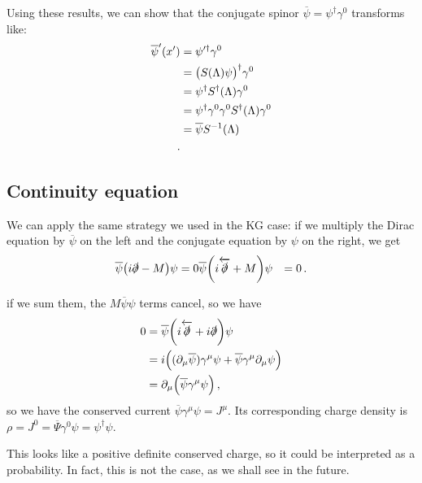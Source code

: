 \documentclass[main.tex]{subfiles}
\begin{document}
Using these results, we can show that the conjugate spinor \(\overline{\psi} = \psi ^\dag \gamma^{0}\) transforms like: 
%
\begin{subequations}
\begin{align}
\overline{\psi}' (x') &= \psi^{\prime \dag} \gamma^{0}  \\
&= \qty(S(\Lambda ) \psi ) ^\dag \gamma^{0}  \\
&= \psi ^\dag S ^\dag (\Lambda ) \gamma^{0} \\
&= \psi ^\dag \gamma^{0} \gamma^{0} S ^\dag (\Lambda ) \gamma^{0} \\
&= \overline{\psi} S^{-1}(\Lambda ) \\
\,.
\end{align}
\end{subequations}

\subsection{Continuity equation}

We can apply the same strategy we used in the KG case: if we multiply the Dirac equation by \(\overline{\psi}\) on the left and the conjugate equation by \(\psi \) on the right, we get 
%
\begin{align}
\overline{\psi} \qty(i \slashed{\partial} - M ) \psi &= 0 
\overline{\psi} \qty(i \overleftarrow{\slashed{\partial}} + M ) \psi &= 0 
\,.
\end{align}

if we sum them, the \(M \overline{\psi} \psi  \) terms cancel, so we have 
%
\begin{subequations}
\begin{align}
0 &= \overline{\psi} \qty(i \overleftarrow{\slashed{\partial}} + i \slashed{\partial}) \psi   \\
&= i \qty( (\partial_{\mu }\overline{\psi}) \gamma^{\mu } \psi   + \overline{\psi} \gamma^{\mu }\partial_{\mu } \psi)  \\
&= \partial_{\mu } \qty(\overline{\psi} \gamma^{\mu } \psi )
\,,
\end{align}
\end{subequations}
%
so we have the conserved current \(\overline{\psi} \gamma^{ \mu } \psi   = J^{\mu }\).
Its corresponding charge density is \(\rho = J^{0}= \overline{\Psi} \gamma^{0} \psi = \psi ^\dag \psi \). 

This looks like a positive definite conserved charge, so it could be interpreted as a probability. 
In fact, this is not the case, as we shall see in the future. 
\end{document}
